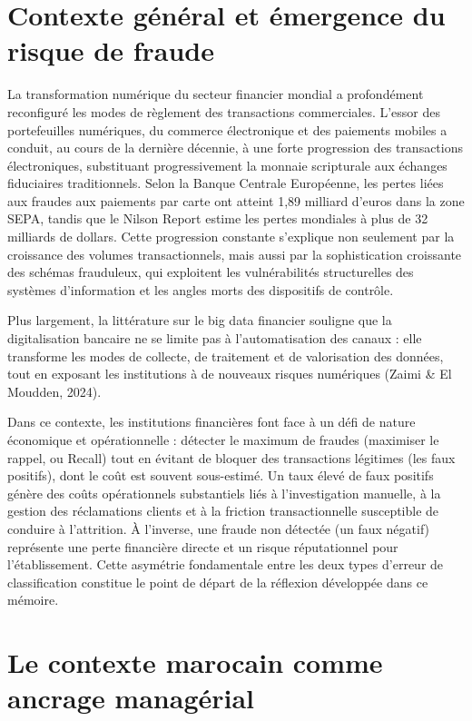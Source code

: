 \section*{Contexte général et émergence du risque de fraude}

La transformation numérique du secteur financier mondial a profondément reconfiguré les modes de règlement des transactions commerciales. L'essor des portefeuilles numériques, du commerce électronique et des paiements mobiles a conduit, au cours de la dernière décennie, à une forte progression des transactions électroniques, substituant progressivement la monnaie scripturale aux échanges fiduciaires traditionnels. Selon la Banque Centrale Européenne, les pertes liées aux fraudes aux paiements par carte ont atteint 1,89 milliard d'euros dans la zone SEPA, tandis que le Nilson Report estime les pertes mondiales à plus de 32 milliards de dollars. Cette progression constante s'explique non seulement par la croissance des volumes transactionnels, mais aussi par la sophistication croissante des schémas frauduleux, qui exploitent les vulnérabilités structurelles des systèmes d'information et les angles morts des dispositifs de contrôle.

Plus largement, la littérature sur le big data financier souligne que la digitalisation bancaire ne se limite pas à l'automatisation des canaux : elle transforme les modes de collecte, de traitement et de valorisation des données, tout en exposant les institutions à de nouveaux risques numériques (Zaimi \& El Moudden, 2024).

Dans ce contexte, les institutions financières font face à un défi de nature économique et opérationnelle : détecter le maximum de fraudes (maximiser le rappel, ou Recall) tout en évitant de bloquer des transactions légitimes (les faux positifs), dont le coût est souvent sous-estimé. Un taux élevé de faux positifs génère des coûts opérationnels substantiels liés à l'investigation manuelle, à la gestion des réclamations clients et à la friction transactionnelle susceptible de conduire à l'attrition. À l'inverse, une fraude non détectée (un faux négatif) représente une perte financière directe et un risque réputationnel pour l'établissement. Cette asymétrie fondamentale entre les deux types d'erreur de classification constitue le point de départ de la réflexion développée dans ce mémoire.

\section*{Le contexte marocain comme ancrage managérial}


